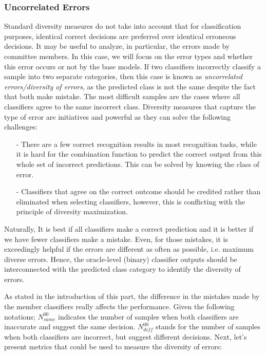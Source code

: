  
\subsubsection{Uncorrelated Errors } \label{ch2_uncorrelated}

Standard diversity measures do not take into account that for classification purposes, identical correct decisions are preferred over identical erroneous decisions. It may be useful to analyze, in particular, the errors made by committee members. In this case, we will focus on the error types and whether this error occurs or not by the base models. If two classifiers incorrectly classify a sample into two separate categories, then this case is known as \textit{uncorrelated errors/diversity of errors}, as the predicted class is not the same despite the fact that both make mistake. The most difficult samples are the cases where all classifiers agree to the same incorrect class. Diversity measures that capture the type of error are initiatives and powerful as they can solve the following challenges:


    


\begin{itemize}[nosep]
\item[-] There are a few correct recognition results in most recognition tasks, while it is hard for the combination function to predict the correct output from this whole set of incorrect predictions. This can be solved by knowing the class of error.
\item[-] Classifiers that agree on the correct outcome should be credited rather than eliminated when selecting classifiers, however, this is conflicting with the principle of diversity maximization. 
\end{itemize}
 
\noindent Naturally, It is best if all classifiers make a correct prediction and it is better if we have fewer classifiers make a mistake. Even, for those mistakes, it is exceedingly helpful if the errors are different as often as possible, i.e. maximum diverse errors. Hence, the oracle-level (binary) classifier outputs should be interconnected with the predicted class category to identify the diversity of errors.


As stated in the introduction of this part, the difference in the mistakes made by the member classifiers really affects the performance. Given the following notations; $N_{same}^{00}$ indicates the number of samples when both classifiers are inaccurate and suggest the same decision. $N_{diff}^{00}$ stands for the number of samples when both classifiers are incorrect, but suggest different decisions. Next, let's present metrics \cite{aksela2006} that could be used to measure the diversity of errors: 

